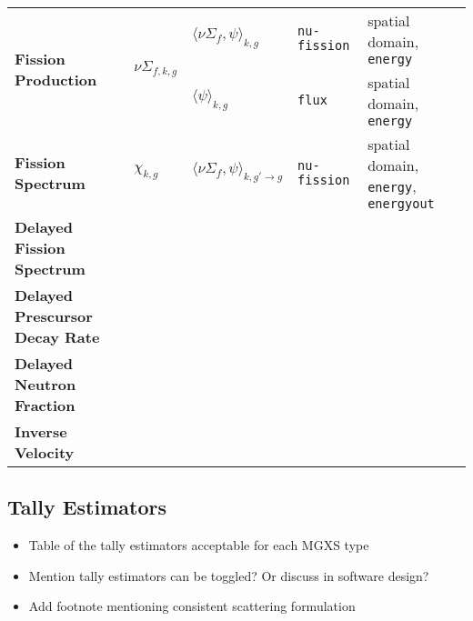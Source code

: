 \begin{table}[h!]
\begin{tabular}{ m{2.3cm} m{1.2cm} m{2cm} m{2.5cm} l }
  \midrule

  \multirow{2}{*}{\parbox{1.5cm}{\bf Fission \hspace{1cm} Production}} & \multirow{2}{*}{$\nu\Sigma_{f,k,g}$} & $\langle \nu\Sigma_{f}, \psi \rangle_{k,g}$ & \texttt{nu-fission} & spatial domain, \texttt{energy} \\
  \cline{3-5}
  & & $\langle \psi \rangle_{k,g}$ & \texttt{flux} & spatial domain, \texttt{energy} \\

  \midrule
  
  \parbox{1.5cm}{\parbox{1.2cm}{\bf Fission Spectrum}} & $\chi_{k,g}$ & $\langle \nu\Sigma_{f}, \psi \rangle_{k,g'\rightarrow g}$ & \texttt{nu-fission} & spatial domain, \texttt{energy}, \texttt{energyout} \\

  \midrule

  \parbox{1.5cm}{\parbox{1.9cm}{\bf Delayed Fission Spectrum}} & & & \\

  \midrule

  \parbox{1.5cm}{\parbox{2.3cm}{\bf Delayed Prescursor Decay Rate}} & & & \\

  \midrule

  \parbox{1.5cm}{\parbox{2cm}{\bf Delayed Neutron Fraction}} & & & \\

  \midrule

  \parbox{1.5cm}{\parbox{1.2cm}{\bf Inverse Velocity}} & & & \\

  \midrule

\end{tabular}
\end{table}


\subsection{Tally Estimators}
\label{subsec:tally-est}

\begin{itemize}[noitemsep]
\item Table of the tally estimators acceptable for each MGXS type
\item Mention tally estimators can be toggled? Or discuss in software design?
\item Add footnote mentioning consistent scattering formulation
\end{itemize}


